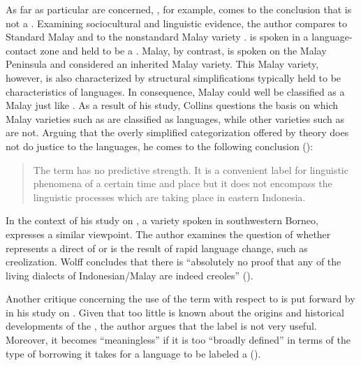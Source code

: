As far as particular  are concerned, \citet{Collins.1980}, for example, comes to the conclusion that  is not a . Examining sociocultural and linguistic evidence, the author compares  to Standard Malay and to the nonstandard Malay variety .  is spoken in a language-contact zone and held to be a .  Malay, by contrast, is spoken on the Malay Peninsula and considered an inherited Malay variety. This Malay variety, however, is also characterized by structural simplifications typically held to be characteristics of  languages. In consequence,  Malay could well be classified as a  Malay just like  \citep[42--53, 57--58]{Collins.1980}. As a result of his study, {Collins} questions the basis on which Malay varieties such as  are classified as  languages, while other varieties such as  are not. Arguing that the overly simplified categorization offered by  theory does not do justice to the  languages, he comes to the following conclusion (\citeyear*[58--59]{Collins.1980}):

\begin{quote}
The term  has no predictive strength. It is a convenient label for linguistic phenomena of a certain time and place but it does not encompass the linguistic processes which are taking place in eastern Indonesia.
\end{quote}


In the context of his study on , a variety spoken in southwestern Borneo, \cite{Wolff.1988} expresses a similar viewpoint. The author examines the question of whether  represents a direct  of  or is the result of rapid language change, such as creolization. {Wolff} concludes that there is  ``absolutely no proof that any of the living dialects of Indonesian/Malay are indeed creoles'' (\citeyear*[86]{Wolff.1988}).



Another critique concerning the use of the term  with respect to  is put forward by {\citet{Steinhauer.1991}} in his study on . Given that too little is known about the origins and historical developments of the , the author argues that the label  is not very useful. Moreover, it becomes  ``meaningless'' if it is too  ``broadly defined'' in terms of the type of borrowing it takes for a language to be labeled a  (\citeyear*[178]{Steinhauer.1991}).



